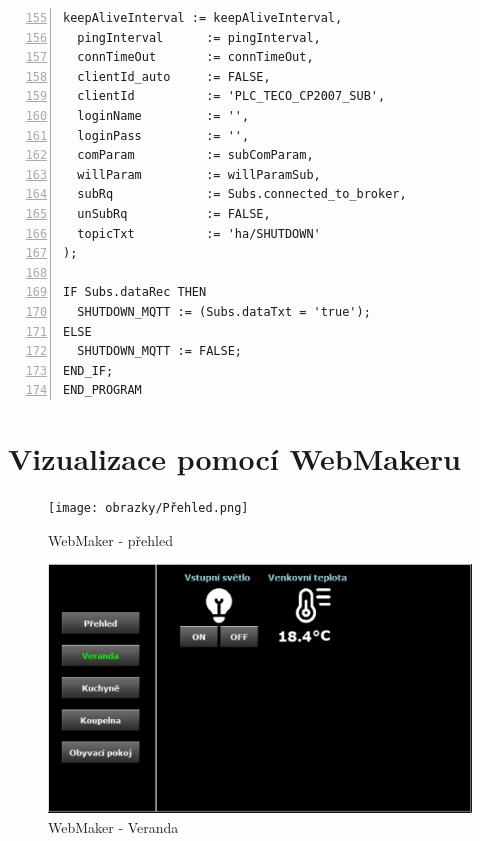 \pagebreak
\begin{lstlisting}[language=ST, breaklines=true, numbers=left, firstnumber=155, numberstyle=\small, numbersep=10pt, frame=single, basicstyle=\ttfamily\small]
  keepAliveInterval := keepAliveInterval,
  pingInterval      := pingInterval,
  connTimeOut       := connTimeOut,
  clientId_auto     := FALSE,
  clientId          := 'PLC_TECO_CP2007_SUB',
  loginName         := '',
  loginPass         := '',
  comParam          := subComParam,
  willParam         := willParamSub,
  subRq             := Subs.connected_to_broker,
  unSubRq           := FALSE,
  topicTxt          := 'ha/SHUTDOWN'
);

IF Subs.dataRec THEN
  SHUTDOWN_MQTT := (Subs.dataTxt = 'true');
ELSE
  SHUTDOWN_MQTT := FALSE;
END_IF;
END_PROGRAM
\end{lstlisting}
\chapter{Vizualizace pomocí WebMakeru}
\label{apend:webmaker}
\begin{figure}[!ht]
  \begin{center}
  \texttt{[image: obrazky/Přehled.png]}
  \end{center}
  \caption[WebMaker - přehled]{WebMaker - přehled}
  \label{fig:webmaker}
\end{figure}
\begin{figure}[!ht]
  \begin{center}
  \includegraphics[scale=0.70]{obrazky/Venek.png}
  \end{center}
  \caption[WebMaker - Veranda]{WebMaker - Veranda}
  \label{fig:webmaker2}
\end{figure}
